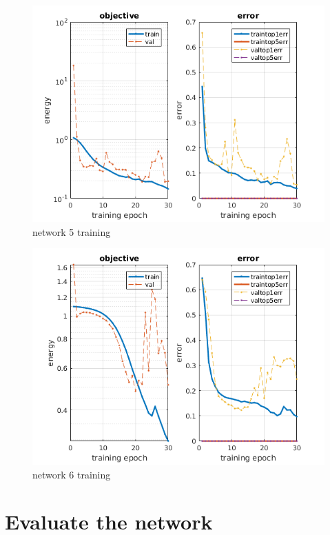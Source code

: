 \documentclass[]{report}
\begin{document}
\begin{figure}[h]
	\begin{center}
		\includegraphics[scale=0.5]{init_5.png}
		\caption{network 5 training}
		\label{fig:training5}
	\end{center}
\end{figure}

\begin{figure}[h]
	\begin{center}
		\includegraphics[scale=0.5]{init_6.png}
		\caption{network 6 training}
		\label{fig:training6}
	\end{center}
\end{figure}

\chapter{Evaluate the network}
\end{document}
